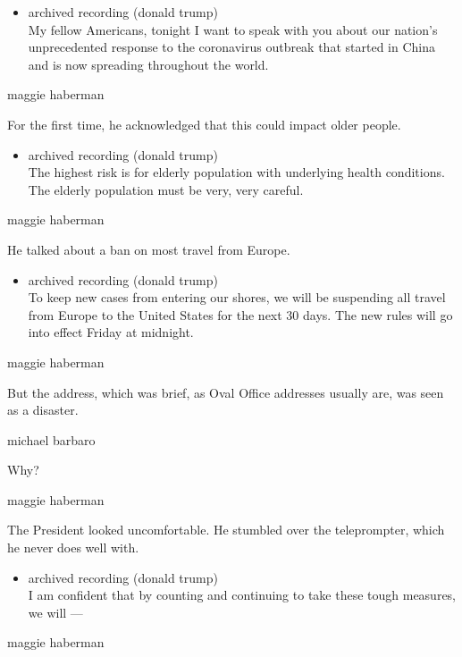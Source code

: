 \begin{itemize}
\tightlist
\item
  archived recording (donald trump)\\
  My fellow Americans, tonight I want to speak with you about our
  nation's unprecedented response to the coronavirus outbreak that
  started in China and is now spreading throughout the world.
\end{itemize}

maggie haberman

For the first time, he acknowledged that this could impact older people.

\begin{itemize}
\tightlist
\item
  archived recording (donald trump)\\
  The highest risk is for elderly population with underlying health
  conditions. The elderly population must be very, very careful.
\end{itemize}

maggie haberman

He talked about a ban on most travel from Europe.

\begin{itemize}
\tightlist
\item
  archived recording (donald trump)\\
  To keep new cases from entering our shores, we will be suspending all
  travel from Europe to the United States for the next 30 days. The new
  rules will go into effect Friday at midnight.
\end{itemize}

maggie haberman

But the address, which was brief, as Oval Office addresses usually are,
was seen as a disaster.

michael barbaro

Why?

maggie haberman

The President looked uncomfortable. He stumbled over the teleprompter,
which he never does well with.

\begin{itemize}
\tightlist
\item
  archived recording (donald trump)\\
  I am confident that by counting and continuing to take these tough
  measures, we will ---
\end{itemize}

maggie haberman

